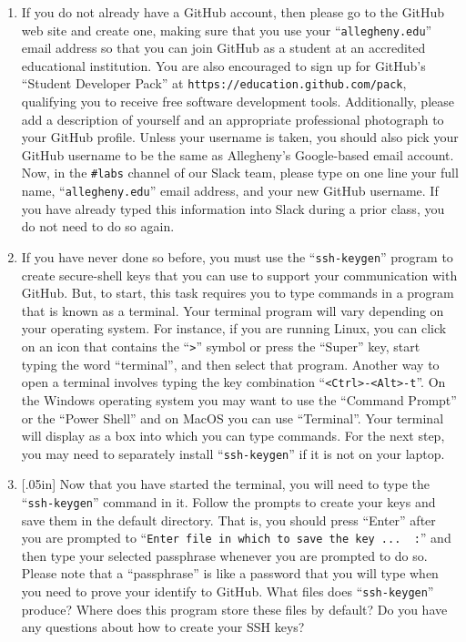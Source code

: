 \documentclass[11pt]{article}
\newcommand{\command}[1]{``\lstinline{#1}''}
\newcommand{\url}[1]{\lstinline{#1}}
\newcommand{\channel}[1]{\lstinline{#1}}
\newcommand{\think}[1]{\null\hfill\LARGE{\faCogs{}}\newline\scriptsize{\em{#1}}}
\begin{document}
\begin{enumerate}

  \item If you do not already have a GitHub account, then please go to the
    GitHub web site and create one, making sure that you use your
    \command{allegheny.edu} email address so that you can join GitHub as a
    student at an accredited educational institution. You are also encouraged
    to sign up for GitHub's ``Student Developer Pack'' at
    \url{https://education.github.com/pack}, qualifying you to receive free
    software development tools. Additionally, please add a description of
    yourself and an appropriate professional photograph to your GitHub profile.
    Unless your username is taken, you should also pick your GitHub username to
    be the same as Allegheny's Google-based email account. Now, in the
    \channel{#labs} channel of our Slack team, please type on one line your
    full name, \command{allegheny.edu} email address, and your new GitHub
    username. If you have already typed this information into Slack during a
    prior class, you do not need to do so again.

  \item If you have never done so before, you must use the \command{ssh-keygen}
    program to create secure-shell keys that you can use to support your
    communication with GitHub. But, to start, this task requires you to type
    commands in a program that is known as a terminal.
    Your terminal program will vary depending on your operating system. For
    instance, if you are running Linux, you can click on an icon that contains
    the \command{>} symbol or press the ``Super'' key, start typing the word
    ``terminal'', and then select that program. Another way to open a terminal
    involves typing the key combination \command{<Ctrl>-<Alt>-t}.
    On the Windows operating system you may want to use the ``Command Prompt''
    or the ``Power Shell'' and on MacOS you can use ``Terminal''.
    Your terminal will display as a box into which you can type commands.
    For the next step, you may need to separately install \command{ssh-keygen}
    if it is not on your laptop.

  \item \marginnote{\think{Understand SSH keys}}[.05in] Now that you have
    started the terminal, you will need to type the \command{ssh-keygen} command
    in it. Follow the prompts to create your keys and save them in the default
    directory. That is, you should press ``Enter'' after you are prompted to
    \command{Enter file in which to save the key ...  :} and then type your
    selected passphrase whenever you are prompted to do so. Please note that a
    ``passphrase'' is like a password that you will type when you need to prove
    your identify to GitHub. What files does \command{ssh-keygen} produce? Where
    does this program store these files by default? Do you have any questions
    about how to create your SSH keys?


\end{enumerate}
\end{document}
